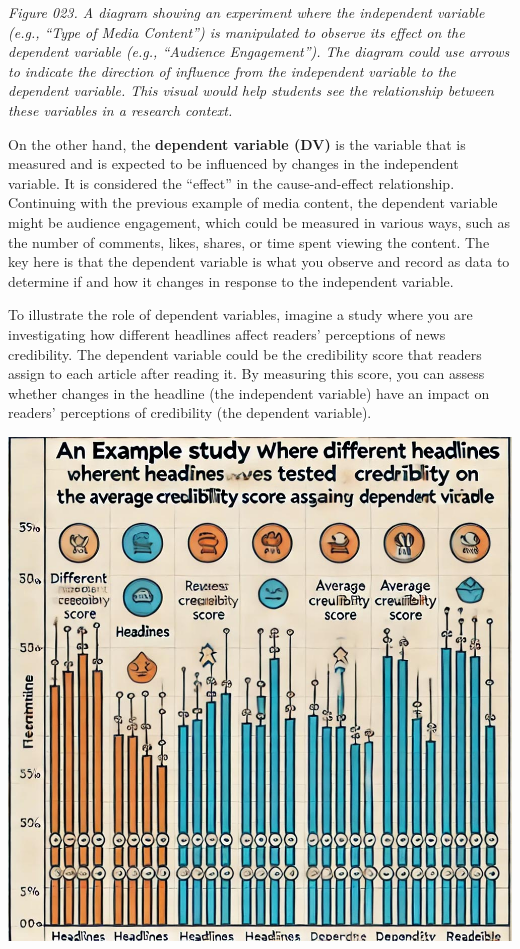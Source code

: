 \documentclass[
]{book}
\begin{document}
\emph{Figure 023. A diagram showing an experiment where the independent variable (e.g., ``Type of Media Content'') is manipulated to observe its effect on the dependent variable (e.g., ``Audience Engagement''). The diagram could use arrows to indicate the direction of influence from the independent variable to the dependent variable. This visual would help students see the relationship between these variables in a research context.}

On the other hand, the \textbf{dependent variable (DV)} is the variable that is measured and is expected to be influenced by changes in the independent variable. It is considered the ``effect'' in the cause-and-effect relationship. Continuing with the previous example of media content, the dependent variable might be audience engagement, which could be measured in various ways, such as the number of comments, likes, shares, or time spent viewing the content. The key here is that the dependent variable is what you observe and record as data to determine if and how it changes in response to the independent variable.

To illustrate the role of dependent variables, imagine a study where you are investigating how different headlines affect readers' perceptions of news credibility. The dependent variable could be the credibility score that readers assign to each article after reading it. By measuring this score, you can assess whether changes in the headline (the independent variable) have an impact on readers' perceptions of credibility (the dependent variable).

\includegraphics[width=1\textwidth,height=\textheight]{images/fig024.jpg}
\end{document}
